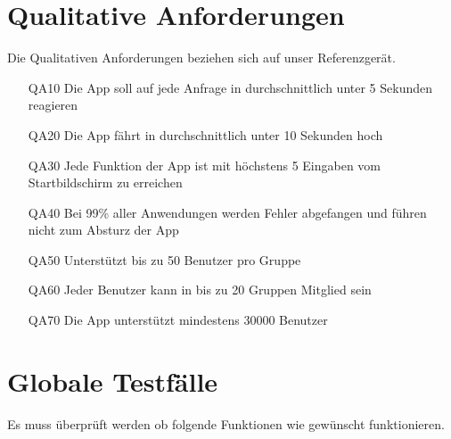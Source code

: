 \documentclass{scrartcl}
\begin{document}
	\section{Qualitative Anforderungen}
	Die Qualitativen Anforderungen beziehen sich auf unser Referenzgerät.
	\begin{itemize}
		\item[QA10] Die App soll auf jede Anfrage in durchschnittlich unter 5 Sekunden reagieren
		\item[QA20] Die App fährt in durchschnittlich unter 10 Sekunden hoch
		\item[QA30] Jede Funktion der App ist mit höchstens 5 Eingaben vom Startbildschirm zu erreichen
		\item[QA40] Bei 99\% aller Anwendungen werden Fehler abgefangen und führen nicht zum Absturz der App
		\item[QA50] Unterstützt bis zu 50 Benutzer pro Gruppe
		\item[QA60] Jeder Benutzer kann in bis zu 20 Gruppen \gls{Mitglied} sein
		\item[QA70] Die App unterstützt mindestens 30000 Benutzer
	\end{itemize}
	
	\newpage
	
	
	\section{Globale Testfälle}

	Es muss überprüft werden ob folgende Funktionen wie gewünscht funktionieren.
	
\end{document}
